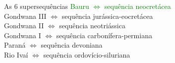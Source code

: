 \documentclass[aspectratio=10]{beamer} %
\begin{document}
\begin{frame}
\begin{columns}
\begin{column}{0.55\textwidth}
\begin{block}{As $6$ supersequências}
\textcolor{green}{Bauru $\Longleftrightarrow$  sequência neocretácea}\\
Gondwana III $\Longleftrightarrow$ sequência jurássica-eocretácea\\
Gondwana II $\Longleftrightarrow$ sequência neotriássica \\
Gondwana I $\Longleftrightarrow$ sequência carbonífera-permiana\\ 
Paraná $\Longleftrightarrow$ sequência devoniana\\
Rio Ivaí $\Longleftrightarrow$ sequência ordovício-siluriana\\
\cite{Vail_1977,assine_1994,milani_orogenias_1998}
\end{block}
\end{column}
\end{columns}
\end{frame}	
\end{document}
